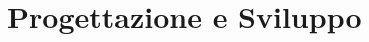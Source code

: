 \documentclass[12pt,italian,oneside]{report}
\begin{document}
\maketitle

\raggedright




\section{Progettazione e Sviluppo}
\end{document}

